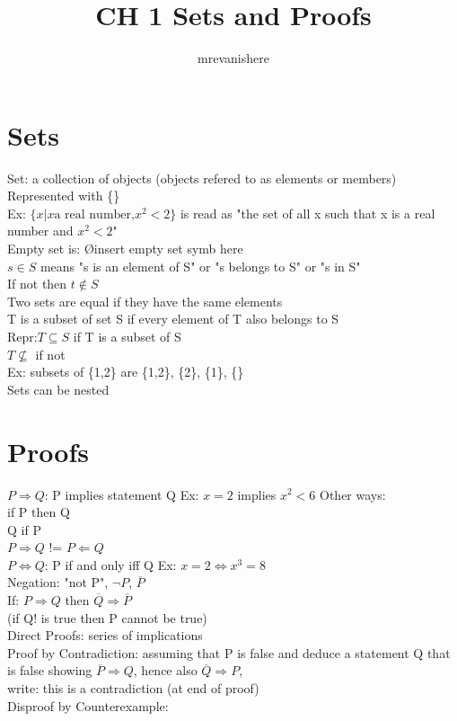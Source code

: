 \documentclass[12pt]{article}
\begin{document}
\title{CH 1 Sets and Proofs}
\author{mrevanishere}
\maketitle

\section{Sets}
	\par
	Set: a collection of objects (objects refered to as elements or 
	members) \\
	Represented with \{\} \\
	Ex: $ \{x|x \text{a real number,}x^2 < 2\} $ is read as
	"the set of all x such that x is a real number and $ x^2 < 2 $" \\
	Empty set is: \O insert empty set symb here \\
	$ s \in S $ means "s is an element of S" or "s belongs to S" or
	"s in S" \\
	If not then $ t \notin S $ \\
	Two sets are equal if they have the same elements \\
	T is a subset of set S if every element of T also belongs to S \\
	Repr:$ T \subseteq S $ if T is a subset of S\\
	$ T \nsubseteq $ if not \\
	Ex: subsets of \{1,2\} are \{1,2\}, \{2\}, \{1\}, \{\} \\
	Sets can be nested 
\section{Proofs}
	$ P \Rightarrow Q $: P implies statement Q
	Ex: $ x=2 $ implies $ x^2 < 6 $
	Other ways:\\
		if P then Q \\
		Q if P \\
	$ P \Rightarrow Q $ != $ P \Leftarrow Q $ \\
	$ P \iff Q $: P if and only iff Q
	Ex: $ x=2 \iff x^3 = 8 $ \\
	Negation: "not P", $ \neg{P} $, $ \overline{P} $ \\
	If: $ P \Rightarrow Q $ then $ \overline{Q} \Rightarrow
	\overline{P} $ \\
	(if Q! is true then P cannot be true)\\
	Direct Proofs: series of implications \\
	Proof by Contradiction: assuming that P is false and deduce a statement
	Q that is false showing $ \overline{P} \Rightarrow Q $, 
	hence also $ \overline{Q} \Rightarrow P $, \\
		write: this is a contradiction (at end of proof)\\
	Disproof by Counterexample:
\end{document}
